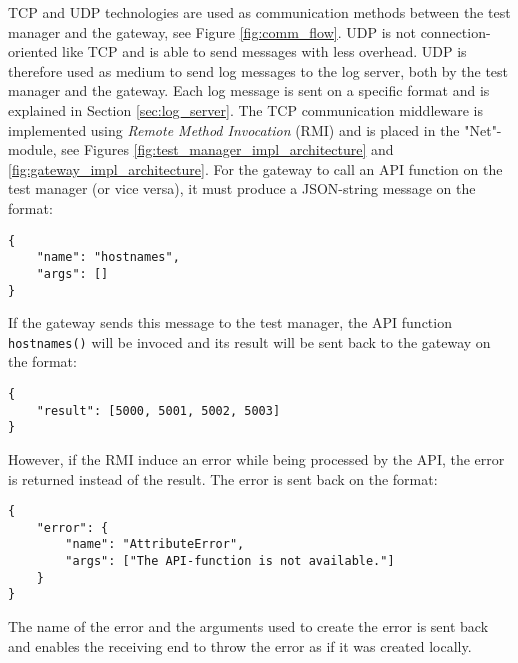 TCP and UDP technologies are used as communication methods between the test
manager and the gateway, see Figure \ref{fig:comm_flow}. UDP is not
connection-oriented like TCP and is able to send messages with less overhead.
UDP is therefore used as medium to send log messages to the log server, both by
the test manager and the gateway. Each log message is sent on a specific format
and is explained in Section \ref{sec:log_server}. The TCP communication
middleware is implemented using \textit{Remote Method Invocation} (RMI)
\cite{coulouris2005distributed} and is placed in the "Net"-module, see Figures
\ref{fig:test_manager_impl_architecture} and
\ref{fig:gateway_impl_architecture}. For the gateway to call an API function on
the test manager (or vice versa), it must produce a JSON-string message on the
format:

\begin{lstlisting}
{
    "name": "hostnames",
    "args": []
}
\end{lstlisting}

If the gateway sends this message to the test manager, the API function
\texttt{hostnames()} will be invoced and its result will be sent back to the
gateway on the format:

\begin{lstlisting}
{
    "result": [5000, 5001, 5002, 5003]
}
\end{lstlisting}

However, if the RMI induce an error while being processed by the API, the error
is returned instead of the result. The error is sent back on the format:

\begin{lstlisting}
{
    "error": {
        "name": "AttributeError",
        "args": ["The API-function is not available."]
    }
}
\end{lstlisting}

The name of the error and the arguments used to create the error is sent back
and enables the receiving end to throw the error as if it was created locally.

